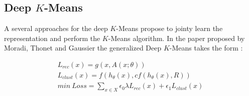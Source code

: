 \subsection{Deep $K$-Means}
A several approaches for the deep $K$-Means propose to jointy learn the
representation and perform the $K$-Means algorithm. 
In the paper proposed by Moradi, Thonet and Gaussier \cite{Deap-K-Means} the
generalized Deep $K$-Means takes the form :

\begin{gather*}
  L_{rec}(x) = g(x, A(x; \theta)) \\
  L_{clust}(x) = f(h_\theta(x), cf(h_\theta(x), R))\\
  min~Loss = \sum_{x \in X} \epsilon_0\lambda L_{rec}(x) + \epsilon_1 L_{clust}
  (x)
\end{gather*}
